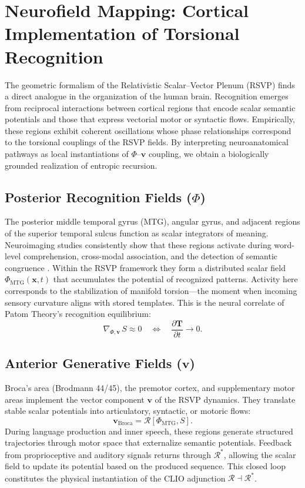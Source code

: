 \documentclass[11pt]{article}
\begin{document}
\section{Neurofield Mapping: Cortical Implementation of Torsional Recognition}
The geometric formalism of the Relativistic Scalar--Vector Plenum (RSVP) finds a direct analogue in the organization of the human brain. Recognition emerges from reciprocal interactions between cortical regions that encode scalar semantic potentials and those that express vectorial motor or syntactic flows. Empirically, these regions exhibit coherent oscillations whose phase relationships correspond to the torsional couplings of the RSVP fields. By interpreting neuroanatomical pathways as local instantiations of $\Phi$--$\mathbf{v}$ coupling, we obtain a biologically grounded realization of entropic recursion.

\subsection{Posterior Recognition Fields (\texorpdfstring{$\Phi$}{Φ})}
The posterior middle temporal gyrus (MTG), angular gyrus, and adjacent regions of the superior temporal sulcus function as scalar integrators of meaning. Neuroimaging studies consistently show that these regions activate during word-level comprehension, cross-modal association, and the detection of semantic congruence \citep{ball2020patom}. Within the RSVP framework they form a distributed scalar field $\Phi_{\mathrm{MTG}}(\mathbf{x},t)$ that accumulates the potential of recognized patterns. Activity here corresponds to the stabilization of manifold torsion---the moment when incoming sensory curvature aligns with stored templates. This is the neural correlate of Patom Theory’s recognition equilibrium:
\[
\nabla_{\!\Phi,\mathbf{v}}\,S \approx 0
\quad \Longleftrightarrow \quad
\frac{\partial \mathbf{T}}{\partial t} \to 0.
\]

\subsection{Anterior Generative Fields (\texorpdfstring{$\mathbf{v}$}{v})}
Broca’s area (Brodmann 44/45), the premotor cortex, and supplementary motor areas implement the vector component $\mathbf{v}$ of the RSVP dynamics. They translate stable scalar potentials into articulatory, syntactic, or motoric flows:
\[
\mathbf{v}_{\mathrm{Broca}} = \mathcal{R}[\Phi_{\mathrm{MTG}},S].
\]
During language production and inner speech, these regions generate structured trajectories through motor space that externalize semantic potentials. Feedback from proprioceptive and auditory signals returns through $\mathcal{R}^{\ast}$, allowing the scalar field to update its potential based on the produced sequence. This closed loop constitutes the physical instantiation of the CLIO adjunction $\mathcal{R} \dashv \mathcal{R}^{\ast}$.
\end{document}
